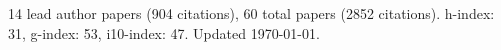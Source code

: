 14 lead author papers (904 citations),
60 total papers (2852 citations).\newline
h-index: 31, g-index: 53, i10-index: 47. Updated \today.